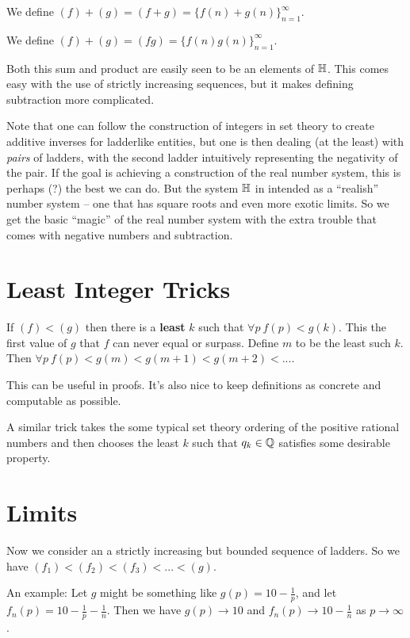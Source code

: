 \documentclass{article}
\renewcommand{\i}{\textit}
\renewcommand{\b}{\textbf}
\newcommand{\q}{\enquote}
\renewcommand{\H}{\Bbb H}
\renewcommand{\l}[1]{( #1 ) }
\begin{document}
\begin{huge}
{{We define $\l{f} + \l{g} = \l{f + g } = \{f(n) + g(n) \}_{n=1}^{\infty}.$ 

We define $\l{f} + \l{g} = \l{fg} = \{f(n)g(n) \}_{n=1}^{\infty}.$ 

Both this sum and product are easily seen to be an elements of $\H$. This comes easy with the use of strictly increasing sequences, but it makes defining subtraction more complicated. 

Note that one can follow the construction of integers in set theory to create additive inverses for ladderlike entities, but one is then dealing (at the least) with \i{pairs} of ladders, with the second ladder intuitively representing the negativity of the pair. If the goal is achieving a construction of the real number system, this is perhaps (?) the best we can do. But the system $\H$ in intended as a \q{realish} number system -- one that has square roots and even more exotic limits. So we get the basic \q{magic} of the real number system with the extra trouble that comes with negative numbers and subtraction. 

\section{Least Integer Tricks}

If $\l{f} < \l{g}$ then there is a \b{least} $k$ such that $\forall p \ f(p) < g(k)$. This the first value of $g$ that $f$ can never equal or surpass. Define $m$ to be the least such $k$. Then $\forall p \ f(p) < g(m) < g(m + 1) < g(m + 2) < ...$. 

This can be useful in proofs. It's also nice to keep definitions as concrete and computable as possible.

A similar trick takes the some typical set theory ordering of the positive rational numbers and then chooses the least $k$ such that $q_k \in \Bbb Q$ satisfies some desirable property. }}

\section{Limits}

Now we consider an a strictly increasing but bounded sequence of ladders. So we have $\l{f_1}  < \l{f_2}  < \l{f_3} < ... < \l{g}$.  

An example: Let $g$ might be something like $g(p) = 10 - \frac{1}{p}$, and let $f_n(p) = 10 - \frac{1}{p} - \frac{1}{n}$. Then we have $g(p) \to 10$ and $f_n(p) \to 10 - \frac{1}{n}$ as $p \to \infty$.


\end{huge}
\end{document}
